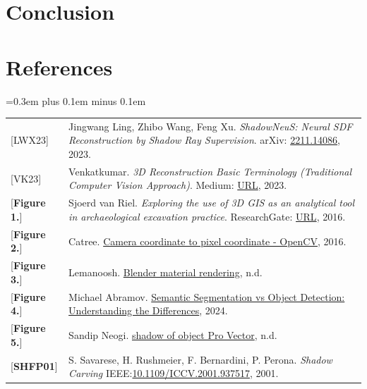 \documentclass[12pt,a4paper]{article}
\theoremstyle{definition}
\begin{document}
\section{Conclusion}


\section*{References}
\spaceskip=0.3em plus 0.1em minus 0.1em
\begin{tabular}{p{}p{}}
{[LWX23]}               & Jingwang Ling, Zhibo Wang, Feng Xu. \textit{ShadowNeuS: Neural SDF Reconstruction by Shadow Ray Supervision}. arXiv: \href{https://arxiv.org/abs/2211.14086}{2211.14086}, 2023. \hypertarget{[LWX23]}{}  \\
{[VK23]}                & Venkatkumar. \textit{3D Reconstruction Basic Terminology (Traditional Computer Vision Approach)}. Medium: \href{https://medium.com/@VK_Venkatkumar/3d-reconstruction-basic-terminology-traditional-computer-vision-e148496f389}{URL}, 2023. \hypertarget{[VK23]}{} \\
{[\textbf{Figure 1.}]}  & Sjoerd van Riel. \textit{Exploring the use of 3D GIS as an analytical tool in archaeological excavation practice}. ResearchGate: \href{https://www.researchgate.net/figure/Structure-from-Motion-SfM-photogrammetric-principle-Source-Theia-sfmorg-2016_fig3_303824023}{URL}, 2016. \hypertarget{[Fig 1]}{} \\
{[\textbf{Figure 2.}]}  & Catree. \href{https://stackoverflow.com/questions/38494485/camera-coordinate-to-pixel-coordinate-opencv}{Camera coordinate to pixel coordinate - OpenCV}, 2016. \hypertarget{[Fig 2]}{} \\
{[\textbf{Figure 3.}]}  & Lemanoosh. \href{https://lemanoosh.com/online-course-blender-material-rendering/}{Blender material rendering}, n.d. \hypertarget{[Fig 3]}{}  \\
{[\textbf{Figure 4.}]}  & Michael Abramov. \href{https://keymakr.com/blog/semantic-segmentation-vs-object-detection-understanding-the-differences/}{Semantic Segmentation vs Object Detection: Understanding the Differences}, 2024. \hypertarget{[Fig 4]}{}  \\
{[\textbf{Figure 5.}]}  & Sandip Neogi. \href{https://www.vecteezy.com/vector-art/42399612-shadow-of-object}{shadow of object Pro Vector}, n.d. \hypertarget{[Fig 5]}{}  \\
{[\textbf{SHFP01}]}     & S. Savarese, H. Rushmeier, F. Bernardini, P. Perona. \textit{Shadow Carving} IEEE:\href{https://ieeexplore.ieee.org/document/937517}{10.1109/ICCV.2001.937517}, 2001. \hypertarget{[SHFP01]}{}  \\

\end{tabular}
\end{document}
